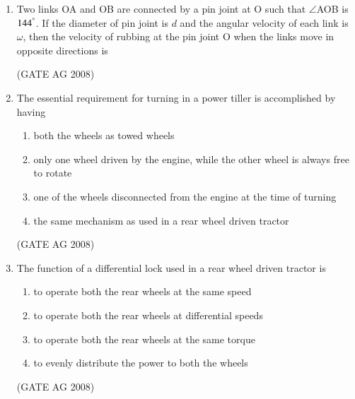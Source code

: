 \documentclass[journal]{IEEEtran}
\begin{document}
\begin{enumerate}
\item 
 Two links OA and OB are connected by a pin joint at O such that $\angle$AOB is $144^ \degree$. If the diameter of pin joint is $d$ and the angular velocity of each link is $\omega$, then the velocity of rubbing at the pin joint O when the links move in opposite directions is 
\begin{enumerate}
\end{enumerate}
\hfill(GATE AG 2008)\\

\medskip

\item 
 The essential requirement for turning in a power tiller is accomplished by having 
\begin{enumerate}
\item  both the wheels as towed wheels
\item  only one wheel driven by the engine, while the other wheel is always free to rotate
\item  one of the wheels disconnected from the engine at the time of turning
\item  the same mechanism as used in a rear wheel driven tractor
\end{enumerate}
\hfill(GATE AG 2008)\\

\medskip

\item 
 The function of a differential lock used in a rear wheel driven tractor is 
\begin{enumerate}
\item  to operate both the rear wheels at the same speed 
\item  to operate both the rear wheels at differential speeds 
\item  to operate both the rear wheels at the same torque 
\item to evenly distribute the power to both the wheels 
\end{enumerate}
\hfill(GATE AG 2008)\\

\medskip


\end{enumerate}
\end{document}
